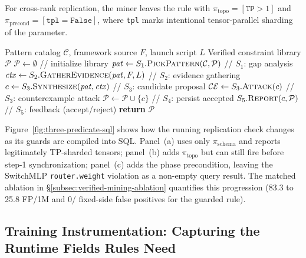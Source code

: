 \documentclass[sigconf,nonacm]{acmart}
\begin{document}
For cross-rank replication, the miner leaves the rule with
$\pi_{\text{topo}} = [\texttt{TP}{>}1]$ and
$\pi_{\text{precond}} = [\texttt{tpl}{=}\texttt{False}]$, where \texttt{tpl}
marks intentional tensor-parallel sharding of the parameter.

\begin{algorithm}[t]
\footnotesize
\caption{Counterexample-guided constraint mining loop.}
\label{alg:miner}
\begin{algorithmic}[1]
\REQUIRE Pattern catalog $\mathcal{C}$, framework source $F$, launch script $L$
\ENSURE  Verified constraint library $\mathcal{P}$
\STATE $\mathcal{P} \gets \emptyset$ \hfill // initialize library
  \STATE $\mathit{pat} \gets S_1.\textsc{PickPattern}(\mathcal{C}, \mathcal{P})$ \hfill // $S_1$: gap analysis
  \STATE $\mathit{ctx} \gets S_2.\textsc{GatherEvidence}(\mathit{pat}, F, L)$ \hfill // $S_2$: evidence gathering
  \STATE $c   \gets S_3.\textsc{Synthesize}(\mathit{pat}, \mathit{ctx})$ \hfill // $S_3$: candidate proposal
  \STATE $\mathcal{CE} \gets S_3.\textsc{Attack}(c)$ \hfill // $S_3$: counterexample attack
     \STATE $\mathcal{P} \gets \mathcal{P} \cup \{c\}$ \hfill // $S_4$: persist accepted
  \ENDIF
  \STATE $S_5.\textsc{Report}(c, \mathcal{P})$ \hfill // $S_5$: feedback (accept/reject)
\ENDWHILE
\STATE \textbf{return} $\mathcal{P}$
\end{algorithmic}
\end{algorithm}

Figure~\ref{fig:three-predicate-sql} shows how the running replication check
changes as its guards are compiled into SQL. Panel~(a) uses only
$\pi_{\text{schema}}$ and reports legitimately TP-sharded tensors;
panel~(b) adds $\pi_{\text{topo}}$ but can still fire before step-1
synchronization; panel~(c) adds the phase precondition, leaving the
SwitchMLP \texttt{router.weight} violation as a non-empty query result. The
matched ablation in \S\ref{subsec:verified-mining-ablation} quantifies this
progression (83.3 to 25.8 FP/1M and 0/\NumFixedReplay{} fixed-side false
positives for the guarded rule).

\subsection{Training Instrumentation: Capturing the Runtime Fields Rules Need}
\label{subsec:data-collector}
\end{document}

